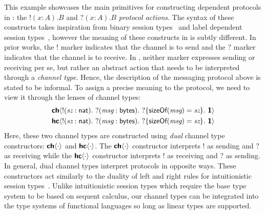 This example showcases the main primitives for constructing dependent protocols in
\TLLC{}: the $!(x : A).B$ and $?(x : A).B$ \emph{protocol actions}. The syntax of these
constructs takes inspiration from binary session types~\cite{gay10,wadler12} and label
dependent session types~\cite{ldst}, however the meaning of these constructs in \TLLC{} is
subtly different. In prior works, the $!$ marker indicates that the channel is to send
and the $?$ marker indicates that the channel is to receive. In \TLLC{}, neither marker
expresses sending or receiving per se, but rather an abstract action that needs to be
interpreted through a \emph{channel type}. Hence, the description of the messaging protocol
above is stated to be informal. To assign a precise meaning to the protocol, we need to
view it through the lenses of channel types:
\begin{align*}
  &\CH{!(\textit{sz}: \textsf{nat}).\ ?(\textit{msg}: \textsf{bytes}).\ ?\{\textsf{sizeOf}(\textit{msg}) = \textit{sz}\}.\ \End} \\
  &\HC{!(\textit{sz}: \textsf{nat}).\ ?(\textit{msg}: \textsf{bytes}).\ ?\{\textsf{sizeOf}(\textit{msg}) = \textit{sz}\}.\ \End}
\end{align*}
Here, these two channel types are constructed using \emph{dual} channel type
constructors: ${\textbf{\textsf{ch}}\langle{\cdot}\rangle}$ and ${\textbf{\textsf{hc}}\langle{\cdot}\rangle}$.  The ${\textbf{\textsf{ch}}\langle{\cdot}\rangle}$ constructor
interprets $!$ as sending and $?$ as receiving while the ${\textbf{\textsf{hc}}\langle{\cdot}\rangle}$
constructor interprets $!$ as receiving and $?$ as sending. In general, dual
channel types interpret protocols in opposite ways. These constructors act similarly
to the duality of left and right rules for intuitionistic session types~\cite{caires10}.
Unlike intuitionistic session types which require the base type system to be
based on sequent calculus, our channel types can be integrated into the type
systems of functional languages so long as linear types are supported.


